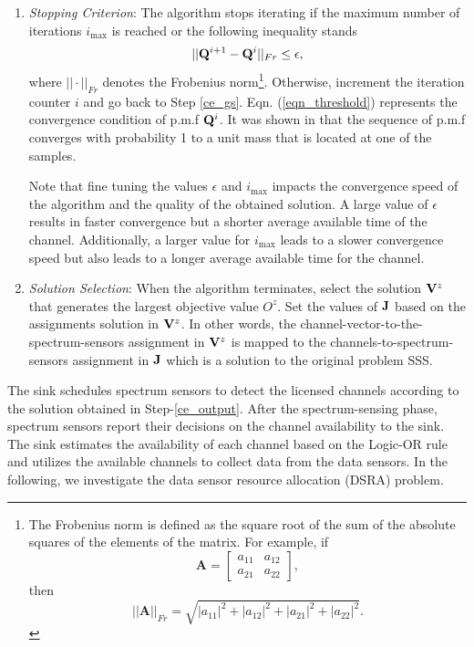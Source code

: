 \documentclass[journal]{IEEEtran} \ifCLASSINFOpdf
\begin{document}
\begin{enumerate}[]
\item \textit{Stopping Criterion}: The algorithm stops iterating if the maximum number of iterations $i_{\max}$ is reached or the following inequality stands
\begin{equation}
    \label{eqn_threshold}
||{\bf Q}^{i+1} - {\bf Q}^i ||_{Fr} \leq \epsilon,
\end{equation}
where $||\cdot ||_{Fr}$ denotes the Frobenius norm\footnote{The Frobenius norm is defined as the square root of the sum of the absolute squares of the elements of the matrix. For example, if
\begin{equation*}
\bm{A} =
\begin{bmatrix}
a_{11} & a_{12} \\
a_{21} & a_{22}
\end{bmatrix},
\end{equation*}
then
\begin{equation*}
|| \bm{A} ||_{Fr} = \sqrt{|a_{11}|^2 + |a_{12}|^2 + |a_{21}|^2 + |a_{22}|^2}.
\end{equation*}
}. Otherwise, increment the iteration counter $i$ and go back to Step \ref{ce_gs}. Eqn. (\ref{eqn_threshold}) represents the convergence condition of p.m.f ${\bf Q}^i$. It was shown in \cite{Costa2007} that the sequence of p.m.f converges with probability 1 to a unit mass that is located at one of the samples.

Note that fine tuning the values $\epsilon$ and $i_{\max}$ impacts the convergence speed of the algorithm and the quality of the obtained solution. A large value of $\epsilon$ results in faster convergence but a shorter average available time of the channel. Additionally, a larger value for $i_{\max}$ leads to a slower convergence speed but also leads to a longer average available time for the channel.
\item \textit{Solution Selection}: When the algorithm terminates, select the solution ${\bf V}^z$ that generates the largest objective value $O^z$. Set the values of ${\bf J}$ based on the assignments solution in ${\bf V}^z$. In other words, the channel-vector-to-the-spectrum-sensors assignment in ${\bf V}^z$ is mapped to the channels-to-spectrum-sensors assignment in ${\bf J}$ which is a solution to the original problem SSS.
    \label{ce_output}
\end{enumerate}

The sink schedules spectrum sensors to detect the licensed channels according to the solution obtained in Step-\ref{ce_output}. After the spectrum-sensing phase, spectrum sensors report their decisions on the channel availability to the sink. The sink estimates the availability of each channel based on the Logic-OR rule and utilizes the available channels to collect data from the data sensors. In the following, we investigate the data sensor resource allocation (DSRA) problem.
\end{document}
